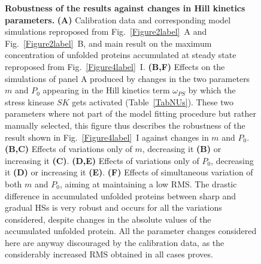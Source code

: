 \documentclass[oneside, 10pt, a4paper, twocolumn]{article}
\begin{document}
\begin{figure}
\caption{\small{{\textbf{Robustness of the results against changes in Hill kinetics parameters.} \textbf{(A)} Calibration data and corresponding model simulations reproposed from Fig.~\ref{Figure2label}~A and Fig.~\ref{Figure2label}~B, and main result on the maximum concentration of unfolded proteins accumulated at steady state reproposed from Fig.~\ref{Figure4label}~I. \textbf{(B,F)} Effects on the simulations of panel A produced by changes in the two parameters $m$ and $P_0$ appearing in the Hill kinetics term $\omega_{PS}$ by which the stress kinease $SK$ gets activated (Table~\ref{TabNUs}). These two parameters where not part of the model fitting procedure but rather manually selected, this figure thus describes the robustness of the result shown in Fig.~\ref{Figure4label}~I against changes in $m$ and $P_0$. \textbf{(B,C)} Effects of variations only of $m$, decreasing it \textbf{(B)} or increasing it \textbf{(C)}. \textbf{(D,E)} Effects of variations only of $P_0$, decreasing it \textbf{(D)} or increasing it \textbf{(E)}. \textbf{(F)} Effects of simultaneous variation of both $m$ and $P_0$, aiming at maintaining a low RMS. The drastic difference in accumulated unfolded proteins between sharp and gradual HSs is very robust and occurs for all the variations considered, despite changes in the absolute values of the accumulated unfolded protein. All the parameter changes considered here are anyway discouraged by the calibration data, as the considerably increased RMS obtained in all cases proves.}}}
\label{Figure9label}
\end{figure}
\end{document}
